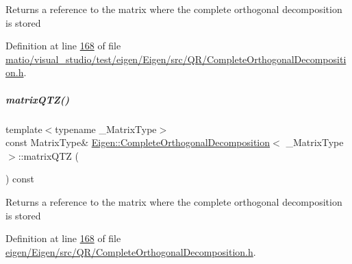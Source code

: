 \begin{DoxyReturn}{Returns}
a reference to the matrix where the complete orthogonal decomposition is stored 
\end{DoxyReturn}


Definition at line \hyperlink{matio_2visual__studio_2test_2eigen_2_eigen_2src_2_q_r_2_complete_orthogonal_decomposition_8h_source_l00168}{168} of file \hyperlink{matio_2visual__studio_2test_2eigen_2_eigen_2src_2_q_r_2_complete_orthogonal_decomposition_8h_source}{matio/visual\+\_\+studio/test/eigen/\+Eigen/src/\+Q\+R/\+Complete\+Orthogonal\+Decomposition.\+h}.

\mbox{\label{group___q_r___module_ad89e2529fc1a8721239d9b6be9613a69}} 
\subparagraph{\texorpdfstring{matrix\+Q\+T\+Z()}{matrixQTZ()}\hspace{0.1cm}{\footnotesize\ttfamily [2/2]}}
{\footnotesize\ttfamily template$<$typename \+\_\+\+Matrix\+Type$>$ \\
const Matrix\+Type\& \hyperlink{group___q_r___module_class_eigen_1_1_complete_orthogonal_decomposition}{Eigen\+::\+Complete\+Orthogonal\+Decomposition}$<$ \+\_\+\+Matrix\+Type $>$\+::matrix\+Q\+TZ (\begin{DoxyParamCaption}{ }\end{DoxyParamCaption}) const\hspace{0.3cm}{\ttfamily [inline]}}

\begin{DoxyReturn}{Returns}
a reference to the matrix where the complete orthogonal decomposition is stored 
\end{DoxyReturn}


Definition at line \hyperlink{eigen_2_eigen_2src_2_q_r_2_complete_orthogonal_decomposition_8h_source_l00168}{168} of file \hyperlink{eigen_2_eigen_2src_2_q_r_2_complete_orthogonal_decomposition_8h_source}{eigen/\+Eigen/src/\+Q\+R/\+Complete\+Orthogonal\+Decomposition.\+h}.

